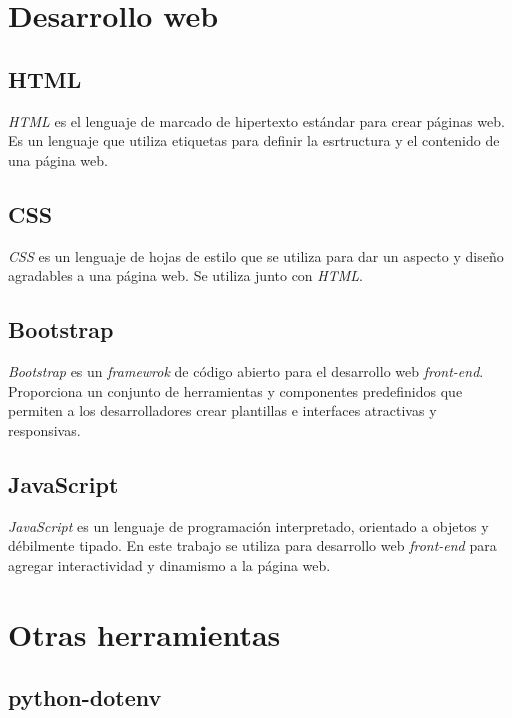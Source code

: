\section{Desarrollo web}\label{desarrollo_web}

\subsection{HTML}\label{html}

\emph{HTML} \citep{wiki:html} es el lenguaje de marcado de hipertexto estándar para crear páginas web. Es un lenguaje que utiliza etiquetas para definir la esrtructura y el contenido de una página web. 

\subsection{CSS}\label{css}

\emph{CSS} \citep{wiki:css} es un lenguaje de hojas de estilo que se utiliza para dar un aspecto y diseño agradables a una página web. Se utiliza junto con \emph{HTML}.

\subsection{Bootstrap}\label{bootstrap}

\emph{Bootstrap} \citep{online:bootstrap} es un \emph{framewrok} de código abierto para el desarrollo web \emph{front-end}. Proporciona un conjunto de herramientas y componentes predefinidos que permiten a los desarrolladores crear plantillas e interfaces atractivas y responsivas. 

\subsection{JavaScript}\label{javascript}

\emph{JavaScript} \citep{wiki:javascript} es un lenguaje de programación interpretado, orientado a objetos y débilmente tipado. En este trabajo se utiliza para desarrollo web \emph{front-end} para agregar 
interactividad y dinamismo a la página web. 


\section{Otras herramientas}\label{otras_herramientas}

\subsection{python-dotenv}\label{python-dotenv}

